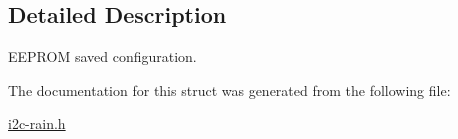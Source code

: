 \subsection{Detailed Description}
E\+E\+P\+R\+OM saved configuration. 

The documentation for this struct was generated from the following file\+:\begin{DoxyCompactItemize}
\item 
\hyperlink{i2c-rain_8h}{i2c-\/rain.\+h}\end{DoxyCompactItemize}
